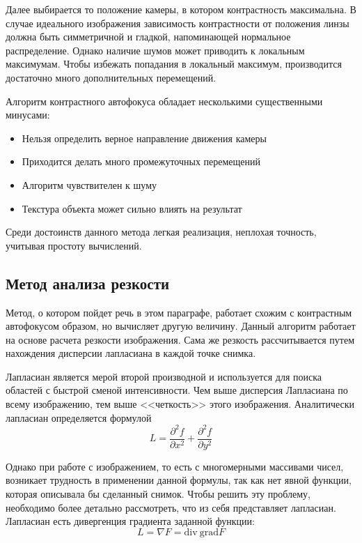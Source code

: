 Далее выбирается то положение камеры, в котором контрастность максимальна. В случае идеального изображения зависимость контрастности от положения линзы должна быть симметричной и гладкой, напоминающей нормальное распределение. Однако наличие шумов может приводить к локальным максимумам. Чтобы избежать попадания в локальный максимум, производится достаточно много дополнительных перемещений. 

Алгоритм контрастного автофокуса обладает несколькими существенными минусами:
\begin{itemize}
	\item Нельзя определить верное направление движения камеры
	\item Приходится делать много промежуточных перемещений
	\item Алгоритм чувствителен к шуму
	\item Текстура объекта может сильно влиять на результат
\end{itemize}

Среди достоинств данного метода легкая реализация, неплохая точность, учитывая простоту вычислений.

\subsection{Метод анализа резкости}
Метод, о котором пойдет речь в этом параграфе, работает схожим с контрастным автофокусом образом, но вычисляет другую величину. Данный алгоритм работает на основе расчета резкости изображения. Сама же резкость рассчитывается путем нахождения дисперсии лапласиана в каждой точке снимка. 

Лапласиан является мерой второй производной и используется для поиска областей с быстрой сменой интенсивности. Чем выше дисперсия Лапласиана по всему изображению, тем выше <<четкость>> этого изображения. Аналитически лапласиан определяется формулой
\begin{equation}
	L=\frac{\partial^2 f}{\partial x^2} + \frac{\partial^2 f}{\partial y^2}
\end{equation}

Однако при работе с изображением, то есть с многомерными массивами чисел, возникает трудность в применении данной формулы, так как нет явной функции, которая описывала бы сделанный снимок. Чтобы решить эту проблему, необходимо более детально рассмотреть, что из себя представляет лапласиан. Лапласиан есть дивергенция градиента заданной функции:
\begin{equation}
	L = \nabla F = \text{div}\ \text{grad} F
\end{equation}

